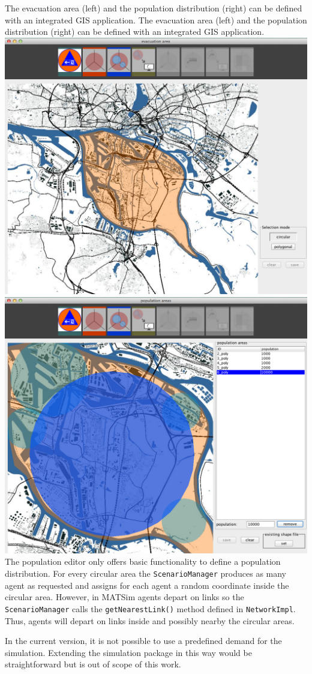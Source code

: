 \createfigure%
{The evacuation area (left) and the population distribution (right) can be defined with an integrated GIS application.}%
{The evacuation area (left) and the population distribution (right) can be defined with an integrated GIS application.}%
{\label{chap:evac:fig:area_pop}}%
{%
  \createsubfigure%
  {}%
{\includegraphics[width=.475\linewidth]{extending/figures/Evacuation/evac_area_sel}}
  {}%
  {}%
  \createsubfigure%
  {}%
{\includegraphics[width=.475\linewidth]{extending/figures/Evacuation/pop_sel}}
  {}%
  {}%
}%
  {}%
%
The population editor only offers basic functionality to define a population distribution. For every circular area the \verb+ScenarioManager+ produces as many agent as requested and assigns for each agent a random coordinate inside the circular area. However, in MATSim agents depart on links so the \verb+ScenarioManager+ calls the \verb+getNearestLink()+ method defined in \verb+NetworkImpl+. Thus, agents will depart on links inside and possibly nearby the circular areas. 

In the current version, it is not possible to use a predefined demand for the simulation. Extending the simulation package in this way would be straightforward but is out of scope of this work.

